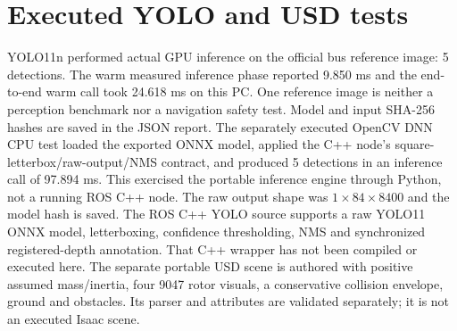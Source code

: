 \section{Executed YOLO and USD tests}
YOLO11n performed actual GPU inference on the official bus reference image: 5 detections. The warm measured inference phase reported 9.850 ms and the end-to-end warm call took 24.618 ms on this PC. One reference image is neither a perception benchmark nor a navigation safety test. Model and input SHA-256 hashes are saved in the JSON report.
The separately executed OpenCV DNN CPU test loaded the exported ONNX model, applied the C++ node's square-letterbox/raw-output/NMS contract, and produced 5 detections in an inference call of 97.894 ms. This exercised the portable inference engine through Python, not a running ROS C++ node. The raw output shape was $1\times84\times8400$ and the model hash is saved.
The ROS C++ YOLO source supports a raw YOLO11 ONNX model, letterboxing,
confidence thresholding, NMS and synchronized registered-depth annotation.
That C++ wrapper has not been compiled or executed here. The separate portable
USD scene is authored with positive assumed mass/inertia, four 9047 rotor
visuals, a conservative collision envelope, ground and obstacles. Its parser
and attributes are validated separately; it is not an executed Isaac scene.

